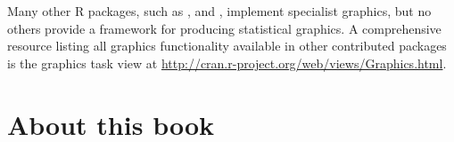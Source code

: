 Many other R packages, such as  \citep{meyer:2006},  \citep{plotrix} and  \citep{gplots}, implement specialist graphics, but no others provide a framework for producing statistical graphics.  A comprehensive resource listing all graphics functionality available in other contributed packages is the graphics task view at \url{http://cran.r-project.org/web/views/Graphics.html}.  

\section{About this book}\label{sec:about_this_book}

% 
% 
% 
% 



